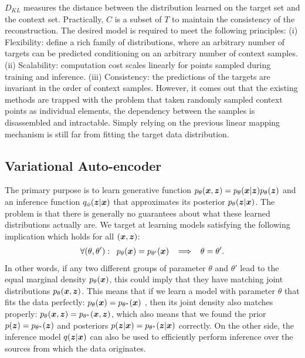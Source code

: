 \documentclass[sigconf]{acmart} %
\begin{document}
$D_{KL}$ measures the distance between the distribution learned on the target set and the context set. Practically, $C$ is a subset of $T$ to maintain the consistency of the reconstruction.
The desired model is required to meet the following principles: (i) Flexibility: define a rich family of distributions, where an arbitrary number of targets can be predicted conditioning on an arbitrary number of context samples. (ii) Scalability: computation cost scales linearly for points sampled during training and inference. (iii) Consistency: the predictions of the targets are invariant in the order of context samples.
However, it comes out that the existing methods are trapped with the problem that taken randomly sampled context points as individual elements, the dependency between the samples is disassembled and intractable.
Simply relying on the previous linear mapping mechanism is still far from fitting the target data distribution.



\subsection{Variational Auto-encoder}

The primary purpose is to learn generative function $p_{\theta}({\bm{x}}, {\bm{z}}) = p_{\theta}({\bm{x}}\vert{\bm{z}})p_{\theta}({\bm{z}})$ and an inference function $q_\phi({\bm{z}}|{\bm{x}})$ that approximates its posterior $p_\theta({\bm{z}}|{\bm{x}})$. The problem is that there is generally no guarantees about what these learned distributions actually are. 
We target at learning models satisfying the following implication which holds for all $({\bm{x}}, {\bm{z}})$:
\begin{align}
    \forall (\theta,\theta'):\;\; p_{\theta}({\bm{x}}) = p_{\theta'}({\bm{x}}) \;\;\implies\;\; \theta = \theta'.
    \label{eq:identifiable}
\end{align}
In other words, if any two different groups of parameter $\theta$ and $\theta'$ lead to the equal marginal density $p_\theta({\bm{x}})$, this could imply that they have matching joint distributions $p_\theta({\bm{x}},{\bm{z}})$. This means that if we learn a model with parameter $\theta$ that fits the data perfectly: $p_{\theta}({\bm{x}}) = p_{\theta^*}({\bm{x}})$ , then its joint density also matches properly: $p_{\theta}({\bm{x}}, {\bm{z}}) = p_{\theta^*}({\bm{x}}, {\bm{z}})$, which also means that we found the prior $p({\bm{z}}) = p_{\theta^*}({\bm{z}})$ and posteriors $p({\bm{z}}\vert{\bm{x}}) = p_{\theta^*}({\bm{z}}\vert{\bm{x}})$ correctly. On the other side, the inference model $q({\bm{z}}|{\bm{x}})$ can also be used to efficiently perform inference over the sources from which the data originates. %
\end{document}
